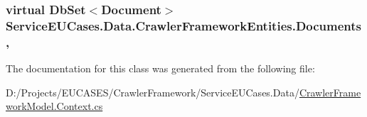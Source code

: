 \hypertarget{class_service_e_u_cases_1_1_data_1_1_crawler_framework_entities_addd97f35a3b23111bf895810019c445e}{
\subsubsection[{Documents}]{\setlength{\rightskip}{0pt plus 5cm}virtual Db\-Set$<${\bf Document}$>$ Service\-E\-U\-Cases.\-Data.\-Crawler\-Framework\-Entities.\-Documents\hspace{0.3cm}{\ttfamily [get]}, {\ttfamily [set]}}}\label{class_service_e_u_cases_1_1_data_1_1_crawler_framework_entities_addd97f35a3b23111bf895810019c445e}


The documentation for this class was generated from the following file\-:\begin{DoxyCompactItemize}
\item 
D\-:/\-Projects/\-E\-U\-C\-A\-S\-E\-S/\-Crawler\-Framework/\-Service\-E\-U\-Cases.\-Data/\hyperlink{_crawler_framework_model_8_context_8cs}{Crawler\-Framework\-Model.\-Context.\-cs}\end{DoxyCompactItemize}

